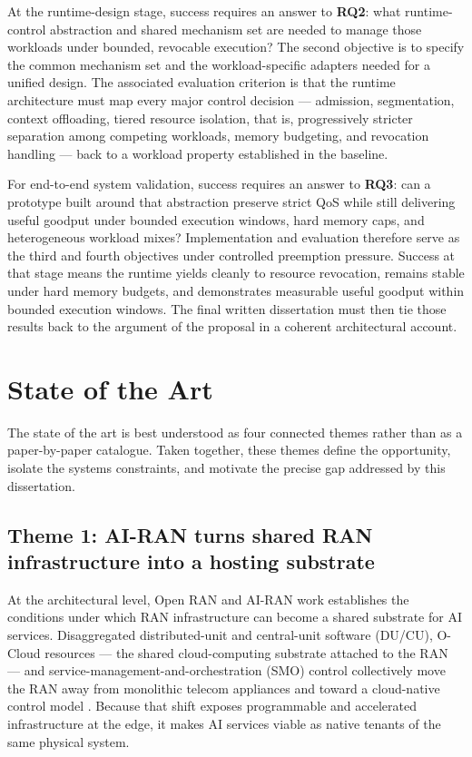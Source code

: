 \documentclass[a4paper,11pt]{article}
\begin{document}
At the runtime-design stage, success requires an answer to \textbf{RQ2}: what runtime-control abstraction and shared mechanism set are needed to manage those workloads under bounded, revocable execution? The second objective is to specify the common mechanism set and the workload-specific adapters needed for a unified design. The associated evaluation criterion is that the runtime architecture must map every major control decision --- admission, segmentation, context offloading, tiered resource isolation, that is, progressively stricter separation among competing workloads, memory budgeting, and revocation handling --- back to a workload property established in the baseline.

For end-to-end system validation, success requires an answer to \textbf{RQ3}: can a prototype built around that abstraction preserve strict QoS while still delivering useful goodput under bounded execution windows, hard memory caps, and heterogeneous workload mixes? Implementation and evaluation therefore serve as the third and fourth objectives under controlled preemption pressure. Success at that stage means the runtime yields cleanly to resource revocation, remains stable under hard memory budgets, and demonstrates measurable useful goodput within bounded execution windows. The final written dissertation must then tie those results back to the argument of the proposal in a coherent architectural account.

\section{State of the Art}

The state of the art is best understood as four connected themes rather than as a paper-by-paper catalogue. Taken together, these themes define the opportunity, isolate the systems constraints, and motivate the precise gap addressed by this dissertation.

\subsection{Theme 1: AI-RAN turns shared RAN infrastructure into a hosting substrate}

At the architectural level, Open RAN and AI-RAN work establishes the conditions under which RAN infrastructure can become a shared substrate for AI services. Disaggregated distributed-unit and central-unit software (DU/CU), O-Cloud resources --- the shared cloud-computing substrate attached to the RAN --- and service-management-and-orchestration (SMO) control collectively move the RAN away from monolithic telecom appliances and toward a cloud-native control model \cite{openairan,beyond,airan}. Because that shift exposes programmable and accelerated infrastructure at the edge, it makes AI services viable as native tenants of the same physical system.
\end{document}
